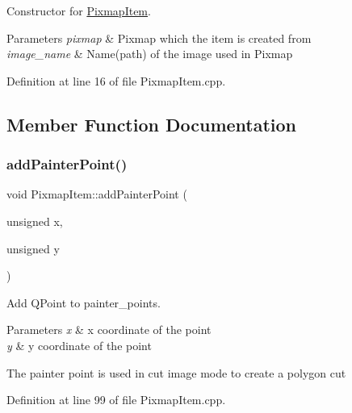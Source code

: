 Constructor for \mbox{\hyperlink{classPixmapItem}{Pixmap\+Item}}. 


\begin{DoxyParams}{Parameters}
{\em pixmap} & Pixmap which the item is created from \\
\hline
{\em image\+\_\+name} & Name(path) of the image used in Pixmap \\
\hline
\end{DoxyParams}


Definition at line 16 of file Pixmap\+Item.\+cpp.



\subsection{Member Function Documentation}
\mbox{\label{classPixmapItem_a6e18b1223f61d40dba6e96f4da15ce5c}} 
\subsubsection{\texorpdfstring{add\+Painter\+Point()}{addPainterPoint()}}
{\footnotesize\ttfamily void Pixmap\+Item\+::add\+Painter\+Point (\begin{DoxyParamCaption}\item[{unsigned}]{x,  }\item[{unsigned}]{y }\end{DoxyParamCaption})}



Add Q\+Point to painter\+\_\+points. 


\begin{DoxyParams}{Parameters}
{\em x} & x coordinate of the point \\
\hline
{\em y} & y coordinate of the point\\
\hline
\end{DoxyParams}
The painter point is used in cut image mode to create a polygon cut 

Definition at line 99 of file Pixmap\+Item.\+cpp.

\mbox{\label{classPixmapItem_a54810877049ab858d569f83065720a18}} 
